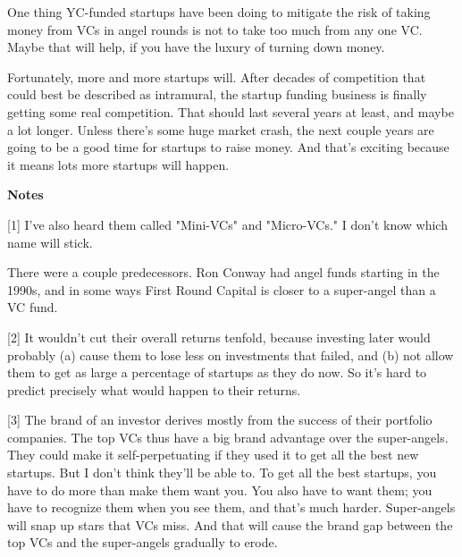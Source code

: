One thing YC-funded
                    startups have been doing to mitigate the risk of taking
                    money from VCs in angel rounds is not to take too much from
                    any one VC. Maybe that will help, if you have the luxury of
                    turning down money.

Fortunately, more and more
                    startups will. After decades of competition that could best
                    be described as intramural, the startup funding business is
                    finally getting some real competition. That should last
                    several years at least, and maybe a lot longer. Unless
                    there's some huge market crash, the next couple years are
                    going to be a good time for startups to raise money. And
                    that's exciting because it means lots more startups will
                    happen.








                    \textbf{Notes}

[1] I've also heard them called "Mini-VCs" and "Micro-VCs." I
                    don't know which name will stick.

There were a
                    couple predecessors. Ron Conway had angel funds starting in
                    the 1990s, and in some ways First Round Capital is closer to
                    a super-angel than a VC fund.

[2] It wouldn't cut their overall returns tenfold, because
                    investing later would probably (a) cause them to lose less
                    on investments that failed, and (b) not allow them to get as
                    large a percentage of startups as they do now. So it's hard
                    to predict precisely what would happen to their returns.

[3] The brand of an investor derives mostly from the success
                    of their portfolio companies. The top VCs thus have a big
                    brand advantage over the super-angels. They could make it
                    self-perpetuating if they used it to get all the best new
                    startups. But I don't think they'll be able to. To get all
                    the best startups, you have to do more than make them want
                    you. You also have to want them; you have to recognize them
                    when you see them, and that's much harder. Super-angels will
                    snap up stars that VCs miss. And that will cause the brand
                    gap between the top VCs and the super-angels gradually to
                    erode.

